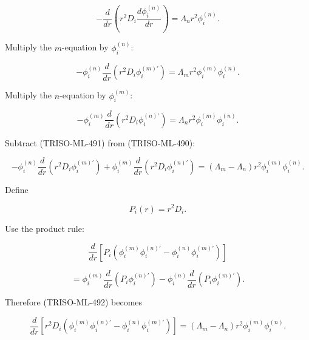 \documentclass[11pt,a4paper]{article}
\begin{document}
\begin{equation}
-\frac{d}{dr}
\left(
r^2D_i\frac{d\phi_i^{(n)}}{dr}
\right)
=
\Lambda_n r^2\phi_i^{(n)}.
\tag{TRISO-ML-489}
\label{eq:triso-ml-489}
\end{equation}

Multiply the $m$-equation by $\phi_i^{(n)}$:

\begin{equation}
-\phi_i^{(n)}
\frac{d}{dr}
\left(
r^2D_i\phi_i^{(m)\prime}
\right)
=
\Lambda_m r^2
\phi_i^{(m)}
\phi_i^{(n)}.
\tag{TRISO-ML-490}
\label{eq:triso-ml-490}
\end{equation}

Multiply the $n$-equation by $\phi_i^{(m)}$:

\begin{equation}
-\phi_i^{(m)}
\frac{d}{dr}
\left(
r^2D_i\phi_i^{(n)\prime}
\right)
=
\Lambda_n r^2
\phi_i^{(m)}
\phi_i^{(n)}.
\tag{TRISO-ML-491}
\label{eq:triso-ml-491}
\end{equation}

Subtract (TRISO-ML-491) from (TRISO-ML-490):

\begin{equation}
-\phi_i^{(n)}
\frac{d}{dr}
\left(
r^2D_i\phi_i^{(m)\prime}
\right)
+
\phi_i^{(m)}
\frac{d}{dr}
\left(
r^2D_i\phi_i^{(n)\prime}
\right)
=
(\Lambda_m-\Lambda_n)
r^2\phi_i^{(m)}\phi_i^{(n)}.
\tag{TRISO-ML-492}
\label{eq:triso-ml-492}
\end{equation}

Define

\begin{equation}
P_i(r)=r^2D_i.
\tag{TRISO-ML-493}
\label{eq:triso-ml-493}
\end{equation}

Use the product rule:

\begin{equation}
\frac{d}{dr}
\left[
P_i
\left(
\phi_i^{(m)}\phi_i^{(n)\prime}
-
\phi_i^{(n)}\phi_i^{(m)\prime}
\right)
\right]
\end{equation}

\begin{equation}
=
\phi_i^{(m)}
\frac{d}{dr}
\left(
P_i\phi_i^{(n)\prime}
\right)
-
\phi_i^{(n)}
\frac{d}{dr}
\left(
P_i\phi_i^{(m)\prime}
\right).
\tag{TRISO-ML-494}
\label{eq:triso-ml-494}
\end{equation}

Therefore (TRISO-ML-492) becomes

\begin{equation}
\frac{d}{dr}
\left[
r^2D_i
\left(
\phi_i^{(m)}\phi_i^{(n)\prime}
-
\phi_i^{(n)}\phi_i^{(m)\prime}
\right)
\right]
=
(\Lambda_m-\Lambda_n)
r^2\phi_i^{(m)}\phi_i^{(n)}.
\tag{TRISO-ML-495}
\label{eq:triso-ml-495}
\end{equation}
\end{document}
